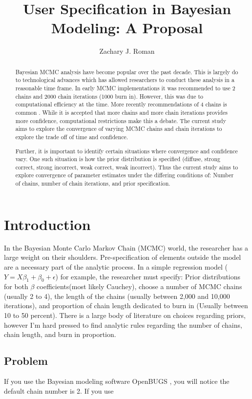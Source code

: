 \documentclass[apa6]{article}
\title{User Specification in Bayesian Modeling: A Proposal}
\author{Zachary J. Roman}
\begin{document}
\maketitle

\begin{abstract}
	Bayesian MCMC analysis have become popular over the past decade. This is largely do to technological advances which has allowed researchers to conduct these analysis in a reasonable time frame. In early MCMC implementations it was recommended to use 2 chains and 2000 chain iterations (1000 burn in). However, this was due to computational efficiency at the time. More recently recommendations of 4 chains is common \cite{plummer2006coda}. While it is accepted that more chains and more chain iterations provides more confidence, computational restrictions make this a debate. The current study aims to explore the convergence of varying MCMC chains and chain iterations to explore the trade off of time and confidence.
	
	Further, it is important to identify certain situations where convergence and confidence vary. One such situation is how the prior distribution is specified (diffuse, strong correct, strong incorrect, weak correct, weak incorrect). Thus the current study aims to explore convergence of parameter estimates under the differing conditions of: Number of chains, number of chain iterations, and prior specification.


\end{abstract}

\section{Introduction}

In the Bayesian Monte Carlo Markov Chain (MCMC) world, the researcher has a large weight on their shoulders. Pre-specification of elements outside the model are a necessary part of the analytic process. In a simple regression model ($Y = X\beta_{1} + \beta_{0} + \epsilon$) for example, the researcher must specify: Prior distributions for both $\beta$ coefficients(most likely Cauchey), choose a number of MCMC chains (usually 2 to 4), the length of the chains (usually between 2,000 and 10,000 iterations), and proportion of chain length dedicated to burn in (Usually between 10 to 50 percent). There is a large body of literature on choices regarding priors, however I'm hard pressed to find analytic rules regarding the number of chains, chain length, and burn in proportion. 

\subsection{Problem}

If you use the Bayesian modeling software OpenBUGS \cite{spiegelhalter2007openbugs}, you will notice the default chain number is 2. If you use 

{}

\end{document}
